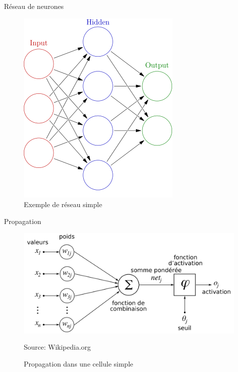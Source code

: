 \documentclass{beamer}
\begin{document}
\begin{frame}{Réseau de neurones}
  \begin{figure}
  \begin{center}
  \includegraphics[scale=0.55]{images/reseau_simple.png}
  \caption{Exemple de réseau simple}
  \end{center}
  \end{figure}
\end{frame}

\begin{frame}{Propagation}
  \begin{figure}
  \begin{center}
  \includegraphics[scale=0.20]{images/propagation_simple.png}
  \caption{Propagation dans une cellule simple}
  {\tiny Source: Wikipedia.org}
  \end{center}
  \end{figure}
\end{frame}
\end{document}
